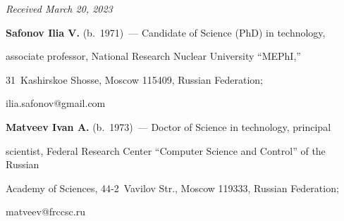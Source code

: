 \vspace*{-6pt}





\hfill{\small\textit{Received March 20, 2023}} 





\vspace*{-12pt} 





\Contr





\noindent


\textbf{Safonov Ilia V.} (b.\ 1971)~--- Candidate of Science (PhD) in technology, 


associate professor, National Research Nuclear University ``MEPhI,'' 


31~Kashirskoe Shosse, Moscow 115409, Russian Federation; 


\mbox{ilia.safonov@gmail.com}





\vspace*{3pt}





\noindent


\textbf{Matveev Ivan A.} (b.\ 1973)~--- Doctor of Science in technology, principal 


scientist, Federal Research Center ``Computer Science and Control'' of the Russian 


Academy of Sciences, 44-2~Vavilov Str., Moscow 119333, Russian Federation; 


\mbox{matveev@frccsc.ru} 





\label{end\stat}





\renewcommand{\bibname}{\protect\rm Литература}    


